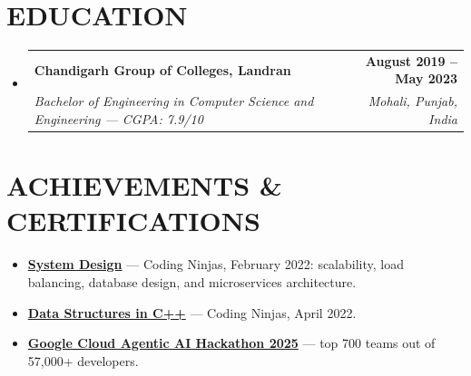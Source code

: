 \documentclass[letterpaper,11pt]{article}
\makeatletter
\newcommand{\resumeItem}[1]{\item\small{{#1 \vspace{-2pt}}}}
\newcommand{\resumeSubheading}[4]{
  \vspace{-2pt}\item
    \begin{tabular*}{1.0\textwidth}[t]{l@{\extracolsep{\fill}}r}
      \textbf{\large#1} & \textbf{\small #2} \\
      \textit{\small#3} & \textit{\small #4} \\
    \end{tabular*}\vspace{-7pt}
}
\newcommand{\resumeSubHeadingListStart}{\begin{itemize}[leftmargin=0.0in, label={}]}
\newcommand{\resumeSubHeadingListEnd}{\end{itemize}}
\newcommand{\resumeItemListStart}{\begin{itemize}}
\newcommand{\resumeItemListEnd}{\end{itemize}\vspace{-5pt}}
\makeatother
\begin{document}
\vspace{-10pt}

\section{EDUCATION}
  \resumeSubHeadingListStart
    \resumeSubheading
      {Chandigarh Group of Colleges, Landran}{August 2019 -- May 2023}
      {Bachelor of Engineering in Computer Science and Engineering — CGPA: 7.9/10}{Mohali, Punjab, India}
  \resumeSubHeadingListEnd

\vspace{-6pt}

\section{ACHIEVEMENTS \& CERTIFICATIONS}
    \vspace{2pt}
    \resumeItemListStart
        \resumeItem{\textbf{\href{http://ninjasfiles.s3.amazonaws.com/certificate18894980e4209379ac28665887f78da42bac5c2.pdf}{System Design}} — Coding Ninjas, February 2022: scalability, load balancing, database design, and microservices architecture.}
        \resumeItem{\textbf{\href{https://ninjasfiles.s3.amazonaws.com/certificate19853580c201378561a01f48ae87f59e9220db2.pdf}{Data Structures in C++}} — Coding Ninjas, April 2022.}
        \resumeItem{\textbf{\href{https://github.com/abhikumar002/Agentic-Gig-Project}{Google Cloud Agentic AI Hackathon 2025}} — top 700 teams out of 57,000+ developers.}
    \resumeItemListEnd
\end{document}
